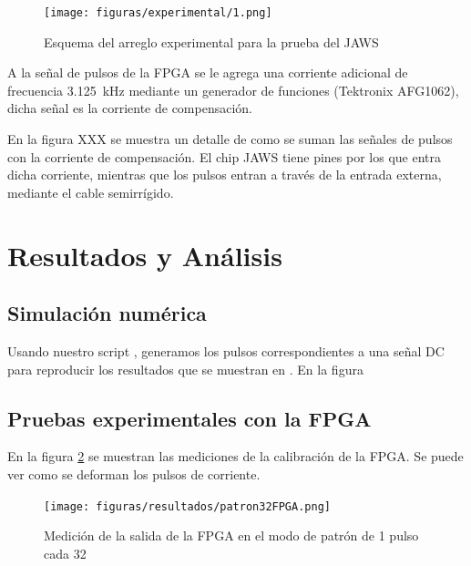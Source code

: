 \documentclass[twoside]{article}
\begin{document}
\begin{multicols}{2}
\begin{figure}[H]
    \centering
    \texttt{[image: figuras/experimental/1.png]}
    \caption{Esquema del arreglo experimental para la prueba del JAWS}
    \label{fig:experimental_1}
\end{figure}

A la señal de pulsos de la FPGA se le agrega una corriente adicional de frecuencia \SI{3.125}{\kilo\hertz} mediante un generador de funciones (Tektronix AFG1062), dicha señal es la corriente de compensación.

En la figura XXX se muestra un detalle de como se suman las señales de pulsos con la corriente de compensación. El chip JAWS tiene pines por los que entra dicha corriente, mientras que los pulsos entran a través de la entrada externa, mediante el cable semirrígido.

\section{Resultados y Análisis}

    \subsection{Simulación numérica}

    Usando nuestro script \cite{script}, generamos los pulsos correspondientes a una señal DC para reproducir los resultados que se muestran en \cite{aziz1996}. En la figura 

    \subsection{Pruebas experimentales con la FPGA}

    En la figura \ref{fig:resultados_patron32FPGA} se muestran las mediciones de la calibración de la FPGA. Se puede ver como se deforman los pulsos de corriente.

    \begin{figure}[H]
        \centering
        \texttt{[image: figuras/resultados/patron32FPGA.png]}
        \caption{Medición de la salida de la FPGA en el modo de patrón de 1 pulso cada 32}
        \label{fig:resultados_patron32FPGA}
    \end{figure}



\end{multicols}





\nocite{*} %
\end{document}

